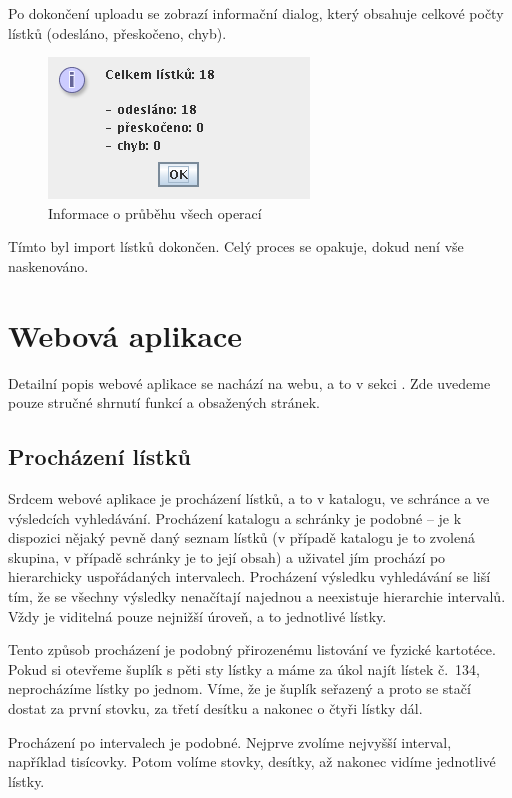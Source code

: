 Po dokončení uploadu se zobrazí informační dialog, který obsahuje celkové počty lístků (odesláno, přeskočeno, chyb).

\begin{figure}
\label{fig:u2e}
\centering
\includegraphics[width=.4\textwidth]{u2e.png}
\caption{Informace o průběhu všech operací}
\end{figure}

Tímto byl import lístků dokončen. Celý proces se opakuje, dokud není vše naskenováno.

\section{Webová aplikace}

Detailní popis webové aplikace se nachází na webu, a to v sekci . Zde uvedeme pouze stručné shrnutí funkcí a obsažených stránek.

\subsection{Procházení lístků}

Srdcem webové aplikace je procházení lístků, a to v katalogu, ve schránce a ve výsledcích vyhledávání. Procházení katalogu a schránky je podobné -- je k dispozici nějaký pevně daný seznam lístků (v případě katalogu je to zvolená skupina, v případě schránky je to její obsah) a uživatel jím prochází po hierarchicky uspořádaných intervalech. Procházení výsledku vyhledávání se liší tím, že se všechny výsledky nenačítají najednou a neexistuje hierarchie intervalů. Vždy je viditelná pouze nejnižší úroveň, a to jednotlivé lístky.

Tento způsob procházení je podobný přirozenému listování ve fyzické kartotéce. Pokud si otevřeme šuplík s pěti sty lístky a máme za úkol najít lístek č.~134, neprocházíme lístky po jednom. Víme, že je šuplík seřazený a proto se stačí dostat za první stovku, za třetí desítku a nakonec o čtyři lístky dál. 

Procházení po intervalech je podobné. Nejprve zvolíme nejvyšší interval, například tisícovky. Potom volíme stovky, desítky, až nakonec vidíme jednotlivé lístky.

